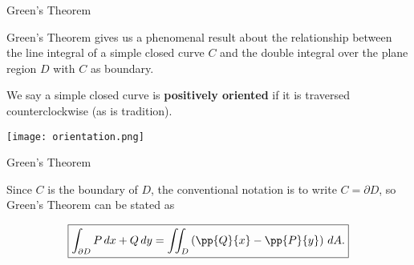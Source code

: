 \documentclass[11pt,english,
handout
]{beamer}
\begin{document}


\makebeamertitle



















\begin{frame}[t]{Green's Theorem}
\small

Green's Theorem gives us a phenomenal result about the relationship between the line integral of a simple closed curve $C$ and the double integral over the plane region $D$ with $C$ as boundary.\pause 

\lspace
\begin{definition}
We say a simple closed curve is \textbf{positively oriented} if it is traversed counterclockwise (as is tradition).
\end{definition}

\begin{center}
\texttt{[image: orientation.png]}
\end{center}
\end{frame}







\begin{frame}[t]{Green's Theorem}
\small


\lspace
{}

Since $C$ is the boundary of $D$, the conventional notation is to write $C=\partial D$, so Green's Theorem can be stated as

\[
\boxed{\int_{\partial D}P\,dx + Q\,dy=\iint_D\left(\pp{Q}{x}-\pp{P}{y}\right)\,dA.}
\]

\end{frame}
\end{document}
